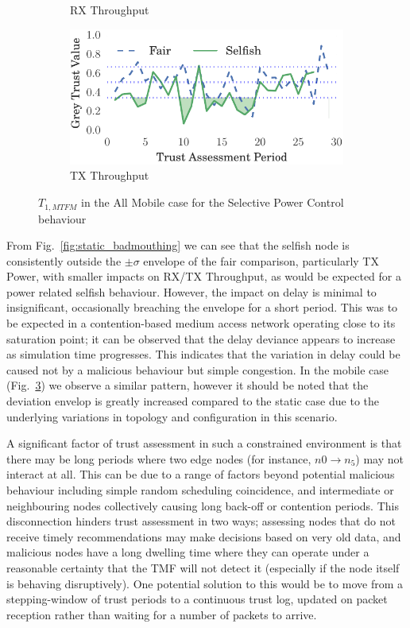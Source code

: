 \documentclass[conference]{IEEEtran}
\begin{document}
\begin{figure}
\begin{subfigure}{0.5\textwidth}
  \caption{RX Throughput}
  \label{fig:all_mobile_badmouthing_rxthroughput}
\end{subfigure}
\begin{subfigure}{0.5\textwidth}
\centering
  \includegraphics[width=.95\linewidth]{img/trust_bella_all_mobile_emph_TXThroughput_BadMouthingPowerControl.pdf}
  \caption{TX Throughput}
  \label{fig:all_mobile_badmouthing_txthroughput}
\end{subfigure}
\caption{$T_{1,MTFM}$ in the All Mobile case for the Selective Power Control behaviour}
\label{fig:all_mobile_badmouthing}
\end{figure}
%
From Fig.~\ref{fig:static_badmouthing} we can see that the selfish node is consistently outside the $\pm\sigma$ envelope of the fair comparison, particularly TX Power, with smaller impacts on RX/TX Throughput, as would be expected for a power related selfish behaviour. 
However, the impact on delay is minimal to insignificant, occasionally breaching the envelope for a short period. 
This was to be expected in a contention-based medium access network operating close to its saturation point; it can be observed that the delay deviance appears to increase as simulation time progresses. 
This indicates that the variation in delay could be caused not by a malicious behaviour but simple congestion.
In the mobile case (Fig.~\ref{fig:all_mobile_badmouthing}) we observe a similar pattern, however it should be noted that the deviation envelop is greatly increased compared to the static case due to the underlying variations in topology and configuration in this scenario.

A significant factor of trust assessment in such a constrained environment is that there may be long periods where two edge nodes (for instance, $n0 \to n_5$) may not interact at all. 
This can be due to a range of factors beyond potential malicious behaviour including simple random scheduling coincidence, and intermediate or neighbouring nodes collectively causing long back-off or contention periods.
This disconnection hinders trust assessment in two ways; assessing nodes that do not receive timely recommendations may make decisions based on very old data, and malicious nodes have a long dwelling time where they can operate under a reasonable certainty that the TMF will not detect it (especially if the node itself is behaving disruptively).
One potential solution to this would be to move from a stepping-window of trust periods to a continuous trust log, updated on packet reception rather than waiting for a number of packets to arrive.
\end{document}
